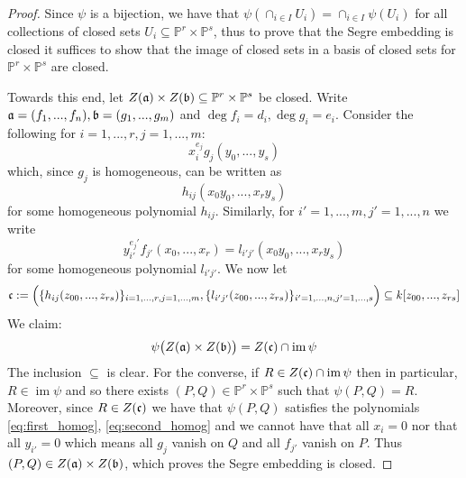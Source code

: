 \documentclass[12pt]{article}
\theoremstyle{plain}
\theoremstyle{definition}
\newcommand{\bb}[1]{\mathbb{#1}}
\begin{document}
\begin{proof}
Since $\psi$ is a bijection, we have that $\psi(\cap_{i \in I}U_i) = \cap_{i \in I}\psi(U_i)$ for all collections of closed sets $U_i \subseteq \bb{P}^r \times \bb{P}^s$, thus to prove that the Segre embedding is closed it suffices to show that the image of closed sets in a basis of closed sets for $\bb{P}^r \times \bb{P}^s$ are closed.

Towards this end, let $Z(\frak{a}) \times Z(\frak{b}) \subseteq \bb{P}^r \times \bb{P}^s$ be closed. Write $\frak{a} = (f_1,...,f_n), \frak{b} = (g_1,...,g_m)$ and $\operatorname{deg}f_i = d_i, \operatorname{deg}g_i = e_i$. Consider the following for $i = 1,...,r, j = 1,..., m$:
\begin{equation}\label{eq:first_homog}
    x_i^{e_j}g_j(y_0,...,y_s)
\end{equation}
which, since $g_j$ is homogeneous, can be written as
\begin{equation}
    h_{ij}(x_0y_0,...,x_ry_s)
\end{equation}
for some homogeneous polynomial $h_{ij}$. Similarly, for $i' = 1,...,m, j' = 1,...,n$ we write
\begin{equation}\label{eq:second_homog}
    y_{i'}^{e_j'}f_{j'}(x_0,...,x_r) = l_{i'j'}(x_0y_0,...,x_ry_s)
\end{equation}
for some homogeneous polynomial $l_{i'j'}$. We now let
\begin{equation}
    \frak{c} := \Big(\lbrace h_{ij}(z_{00},...,z_{rs})\rbrace_{i = 1,...,r, j = 1,...,m}, \lbrace l_{i'j'}(z_{00},...,z_{rs})\rbrace_{i' = 1,...,n, j' = 1,...,s}\Big) \subseteq k[z_{00},...,z_{rs}]
\end{equation}
We claim:
\begin{equation}
    \psi\big(Z(\frak{a}) \times Z(\frak{b})\big) = Z(\frak{c}) \cap \operatorname{im}\psi
\end{equation}
The inclusion $\subseteq$ is clear. For the converse, if $R \in Z(\frak{c}) \cap \operatorname{im}\psi$ then in particular, $R \in \operatorname{im}\psi$ and so there exists $(P,Q) \in \bb{P}^r \times \bb{P}^s$ such that $\psi(P,Q) =R$. Moreover, since $R \in Z(\frak{c})$ we have that $\psi(P,Q)$ satisfies the polynomials \eqref{eq:first_homog}, \eqref{eq:second_homog} and we cannot have that all $x_i = 0$ nor that all $y_{i'} = 0$ which means all $g_j$ vanish on $Q$ and all $f_{j'}$ vanish on $P$. Thus $(P,Q) \in Z(\frak{a}) \times Z(\frak{b})$, which proves the Segre embedding is closed.


\end{proof}
\end{document}
